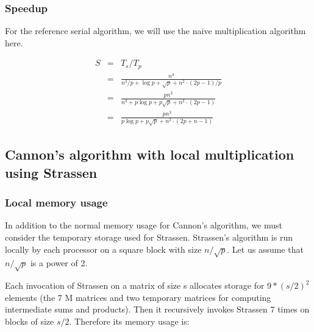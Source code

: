 \documentclass{article}
\begin{document}
\subsubsection{Speedup}

For the reference serial algorithm, we will use the naive multiplication algorithm here.

\begin{eqnarray*}
S &=& T_s / T_p \\
&=& \frac{n^3}{n^3 / p + \log{p} + \sqrt{p} + n^2 \cdot (2p-1)/p} \\
&=& \frac{pn^3}{ n^3 + p\log{p} + p\sqrt{p} + n^2 \cdot (2p-1)} \\
&=& \frac{pn^3}{ p\log{p} + p\sqrt{p} + n^2 \cdot (2p+n-1)}
\end{eqnarray*}


\subsection{Cannon's algorithm with local multiplication using Strassen}

\subsubsection{Local memory usage}

In addition to the normal memory usage for Cannon's algorithm, we must consider
the temporary storage used for Strassen. Strassen's algorithm is run locally by
each processor on a square block with size $n/\sqrt{p}$. Let us assume that
$n/\sqrt{p}$ is a power of 2.

Each invocation of Strassen on a matrix of size s allocates storage for
$9*(s/2)^2$ elements (the 7 M matrices and two temporary matrices for computing
intermediate sums and products). Then it recursively invokes Strassen 7 times on
blocks of size $s/2$. Therefore its memory usage is:
\end{document}
